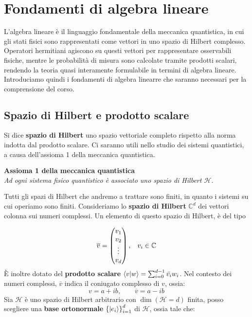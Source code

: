 \chapter{Fondamenti di algebra lineare}
L'algebra lineare è il linguaggio fondamentale della meccanica quantistica, in cui gli stati fisici sono rappresentati come vettori in uno spazio di Hilbert complesso. Operatori hermitiani agiscono su questi vettori per rappresentare osservabili fisiche, mentre le probabilità di misura sono calcolate tramite prodotti scalari, rendendo la teoria quasi interamente formulabile in termini di algebra lineare. Introduciamo quindi i fondamenti di algebra linearre che saranno necessari per la comprensione del corso.



\section{Spazio di Hilbert e prodotto scalare}
Si dice \textbf{spazio di Hilbert} uno spazio vettoriale completo rispetto alla norma indotta dal prodotto scalare. Ci saranno utili nello studio dei sistemi quantistici, a causa dell'assioma 1 della meccanica quantistica.

\begin{center}
	\vspace{3pt}
	\textbf{\Large Assioma 1 della meccanica quantistica}\\
	\vspace{5pt}
	\it Ad ogni sistema fisico quantistico è associato uno spazio di Hilbert $\mathcal{H}$.\rm
\end{center}

Tutti gli spazi di Hilbert che andremo a trattare sono finiti, in quanto i sistemi su cui operiamo sono finiti.
Consideriamo lo \textbf{spazio di Hilbert} $\mathbb{C}^d$ dei vettori colonna sui numeri complessi. Un elemento di questo spazio di Hilbert, è del tipo

$$
\overline{v} =
\begin{pmatrix}
	v_1 \\
	v_2 \\
	\vdots \\
	v_d
\end{pmatrix},
\hspace{0.3cm} v_i \in \mathbb{C}
$$
È inoltre dotato del \textbf{prodotto scalare} $\braket{v|w} = \sum^{d-1}_{i=0}\bar{v_i}w_i$.
Nel contesto dei numeri complessi, $\overline v$ indica il coniugato complesso di $v$, ossia:
$$
v = a + ib, \qquad \overline v = a - ib
$$
%
Sia $\mathcal{H}$ è uno spazio di Hilbert arbitrario con $\dim(\mathcal{H} = d)$ finita, posso scegliere una \textbf{base ortonormale} $\left\{ \ket{e_i} \right\}^d_{i=1}$ di $\mathcal{H}$, ossia tale che:


